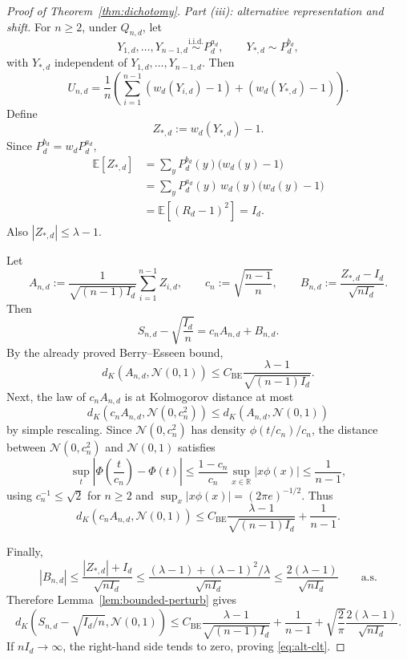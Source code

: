 \documentclass[11pt]{amsart}
\numberwithin{equation}{section}
\theoremstyle{definition}
\newcommand{\R}{\mathbb R}
\newcommand{\E}{\mathbb E}
\newcommand{\iid}{\stackrel{\mathrm{i.i.d.}}{\sim}}
\newcommand{\Normal}{\mathcal N}
\begin{document}
\begin{proof}[Proof of Theorem~\ref{thm:dichotomy}]
\smallskip
\noindent\emph{Part (iii): alternative representation and shift.}
For \(n\ge 2\), under $Q_{n,d}$, let
\[
Y_{1,d},\dots,Y_{n-1,d}\iid P_d^{a_d},
\qquad
Y_{*,d}\sim P_d^{b_d},
\]
with \(Y_{*,d}\) independent of \(Y_{1,d},\dots,Y_{n-1,d}\). Then
\[
U_{n,d}
=
\frac1n\left(
\sum_{i=1}^{n-1} (w_d(Y_{i,d})-1) + (w_d(Y_{*,d})-1)
\right).
\]
Define
\[
Z_{*,d}:=w_d(Y_{*,d})-1.
\]
Since \( P_d^{b_d}=w_d P_d^{a_d} \),
\[
\begin{aligned}
\E[Z_{*,d}]
&=
\sum_y P_d^{b_d}(y)\bigl(w_d(y)-1\bigr)\\
&=
\sum_y P_d^{a_d}(y)\,w_d(y)\bigl(w_d(y)-1\bigr)\\
&=
\E[(R_d-1)^2]
=
I_d.
\end{aligned} \tag{6.13}\label{eq:special-mean}
\]
Also \(|Z_{*,d}|\le \lambda-1\).

Let
\[
A_{n,d}
:=
\frac{1}{\sqrt{(n-1)I_d}}
\sum_{i=1}^{n-1} Z_{i,d},
\qquad
c_n:=\sqrt{\frac{n-1}{n}},
\qquad
B_{n,d}:=\frac{Z_{*,d}-I_d}{\sqrt{nI_d}}.
\]
Then
\[
S_{n,d}-\sqrt{\frac{I_d}{n}} = c_n A_{n,d}+B_{n,d}. \tag{6.14}\label{eq:alt-decomp}
\]
By the already proved Berry--Esseen bound,
\[
d_K(A_{n,d},\Normal(0,1))
\le
C_{\mathrm{BE}}\frac{\lambda-1}{\sqrt{(n-1)I_d}}. \tag{6.15}\label{eq:A-BE}
\]
Next, the law of \(c_n A_{n,d}\) is at Kolmogorov distance at most
\[
d_K(c_nA_{n,d},\Normal(0,c_n^2))
\le d_K(A_{n,d},\Normal(0,1)) \tag{6.16}\label{eq:scaled-BE}
\]
by simple rescaling.
Since \(\Normal(0,c_n^2)\) has density \(\phi(t/c_n)/c_n\), the distance between
\(\Normal(0,c_n^2)\) and \(\Normal(0,1)\) satisfies
\[
\sup_t \left|\Phi\!\left(\frac{t}{c_n}\right)-\Phi(t)\right|
\le \frac{1-c_n}{c_n}\sup_{x\in\R}|x\phi(x)|
\le \frac{1}{n-1}, \tag{6.17}\label{eq:normal-scale}
\]
using \(c_n^{-1}\le \sqrt 2\) for \(n\ge2\) and
\(
\sup_x |x\phi(x)|=(2\pi e)^{-1/2}
\).
Thus
\[
d_K(c_nA_{n,d},\Normal(0,1))
\le
C_{\mathrm{BE}}\frac{\lambda-1}{\sqrt{(n-1)I_d}}+\frac{1}{n-1}. \tag{6.18}\label{eq:cA}
\]

Finally,
\[
|B_{n,d}|
\le \frac{|Z_{*,d}|+I_d}{\sqrt{nI_d}}
\le \frac{(\lambda-1)+(\lambda-1)^2/\lambda}{\sqrt{nI_d}}
\le \frac{2(\lambda-1)}{\sqrt{nI_d}} \qquad \text{a.s.}
\]
Therefore Lemma~\ref{lem:bounded-perturb} gives
\[
d_K\!\left(S_{n,d}-\sqrt{I_d/n},\Normal(0,1)\right)
\le
C_{\mathrm{BE}}\frac{\lambda-1}{\sqrt{(n-1)I_d}}
+\frac{1}{n-1}
+\sqrt{\frac{2}{\pi}}\frac{2(\lambda-1)}{\sqrt{nI_d}}. \tag{6.19}\label{eq:alt-bound}
\]
If \(nI_d\to\infty\), the right-hand side tends to zero, proving \eqref{eq:alt-clt}.


\end{proof}
\end{document}
